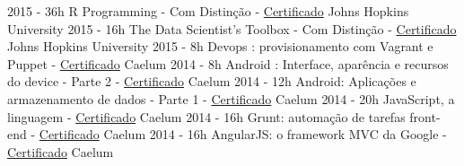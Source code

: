 \begin{entrylistii}
  \entryii
    {2015 - 36h}
    {R Programming - Com Distinção - \href{https://www.coursera.org/account/accomplishments/records/p3u7HG52CSE2qRGP}{Certificado}}
    {Johns Hopkins University}
  \entryii
    {2015 - 16h}
    {The Data Scientist’s Toolbox - Com Distinção - \href{https://www.coursera.org/account/accomplishments/records/EqAPAr2dEYeBbBSB}{Certificado}}
    {Johns Hopkins University}
  \entryii
    {2015 - 8h}
    {Devops : provisionamento com Vagrant e Puppet - \href{https://www.alura.com.br/user/3311/fullCertificate/bdd8817990ef209f0fb6b049f2d2ea0c}{Certificado}}
    {Caelum}
  \entryii
    {2014 - 8h}
    {Android : Interface, aparência e recursos do device - Parte 2 - \href{https://www.alura.com.br/user/3311/fullCertificate/bdd8817990ef209f0fb6b049f2d2ea0c}{Certificado}}
    {Caelum}
  \entryii
    {2014 - 12h}
    {Android: Aplicações e armazenamento de dados - Parte 1 - \href{https://www.alura.com.br/user/3311/fullCertificate/bdd8817990ef209f0fb6b049f2d2ea0c}{Certificado}}
    {Caelum}    
  \entryii
    {2014 - 20h}
    {JavaScript, a linguagem - \href{https://www.alura.com.br/user/3311/fullCertificate/bdd8817990ef209f0fb6b049f2d2ea0c}{Certificado}}
    {Caelum}
  \entryii
    {2014 - 16h}
    {Grunt: automação de tarefas front-end - \href{https://www.alura.com.br/user/3311/fullCertificate/bdd8817990ef209f0fb6b049f2d2ea0c}{Certificado}}
    {Caelum}  
  \entryii
    {2014 - 16h}
    {AngularJS: o framework MVC da Google - \href{https://www.alura.com.br/user/3311/fullCertificate/bdd8817990ef209f0fb6b049f2d2ea0c}{Certificado}}
    {Caelum}

\end{entrylistii}
